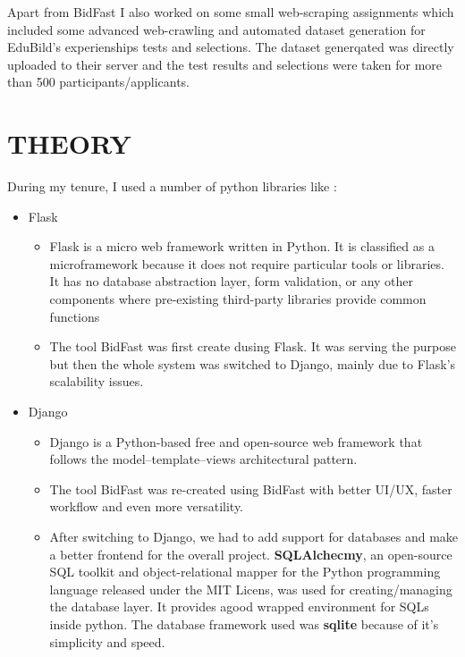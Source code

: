 \documentclass[14pt]{extarticle}
\begin{document}
\par Apart from BidFast I also worked on some small web-scraping assignments which included some advanced web-crawling and automated dataset generation for EduBild's experienships tests and selections. The dataset generqated was directly uploaded to their server and the test results and selections were taken for more than 500 participants/applicants.

\newpage
\section{THEORY}
\par During my tenure, I used a number of python libraries like :
\begin{itemize}
    \item Flask
     \begin{itemize}
        \item \par Flask is a micro web framework written in Python. It is classified as a microframework because it does not require particular tools or libraries. It has no database abstraction layer, form validation, or any other components where pre-existing third-party libraries provide common functions
        \item \par The tool BidFast was first create dusing Flask. It was serving the purpose but then the whole system was switched to Django, mainly due to Flask's scalability issues.
    \end{itemize}
    \item Django
    \begin{itemize}
        \item \par Django is a Python-based free and open-source web framework that follows the model–template–views architectural pattern.
        \item \par The tool BidFast was re-created using BidFast with better UI/UX, faster workflow and even more versatility.
        \item \par After switching to Django, we had to add support for databases and make a better frontend for the overall project. \textbf{SQLAlchecmy}, an open-source SQL toolkit and object-relational mapper for the Python programming language released under the MIT Licens,  was used for creating/managing the database layer. It provides agood wrapped environment for SQLs inside python. The database framework used was \textbf{sqlite} because of it's simplicity and speed.

\end{itemize}
\end{itemize}
\end{document}
